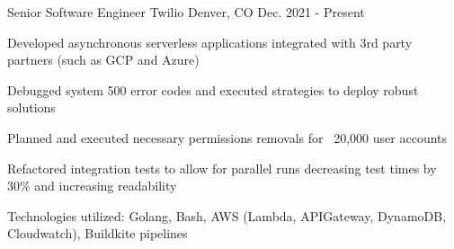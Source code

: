 


\begin{cventries}

\vspace{-.25em}
\cventry
{Senior Software Engineer} %
{Twilio} %
{Denver, CO} %
{Dec. 2021 - Present} %
{ %
\begin{cvitems}
    \item {Developed asynchronous serverless applications integrated with 3rd party partners (such as GCP and Azure)}
    \item {Debugged system 500 error codes and executed strategies to deploy robust solutions}
    \item {Planned and executed necessary permissions removals for ~20,000 user accounts}
    \item {Refactored integration tests to allow for parallel runs decreasing test times by 30\% and increasing readability}
    \item {Technologies utilized: Golang, Bash, AWS (Lambda, APIGateway, DynamoDB, Cloudwatch), Buildkite pipelines}
\end{cvitems}
}


\end{cventries}

